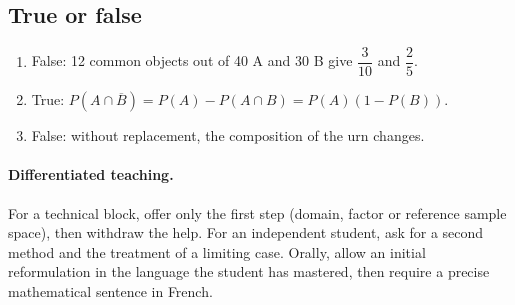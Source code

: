 \subsection*{True or false}
\begin{enumerate}
\item False: 12 common objects out of 40 A and 30 B give $\dfrac{3}{10}$ and $\dfrac{2}{5}$.
\item True: $P(A\cap\overline B)=P(A)-P(A\cap B)=P(A)(1-P(B))$.
\item False: without replacement, the composition of the urn changes.
\end{enumerate}
\paragraph{Differentiated teaching.} For a technical block, offer only the first step (domain, factor or reference sample space), then withdraw the help. For an independent student, ask for a second method and the treatment of a limiting case. Orally, allow an initial reformulation in the language the student has mastered, then require a precise mathematical sentence in French.
